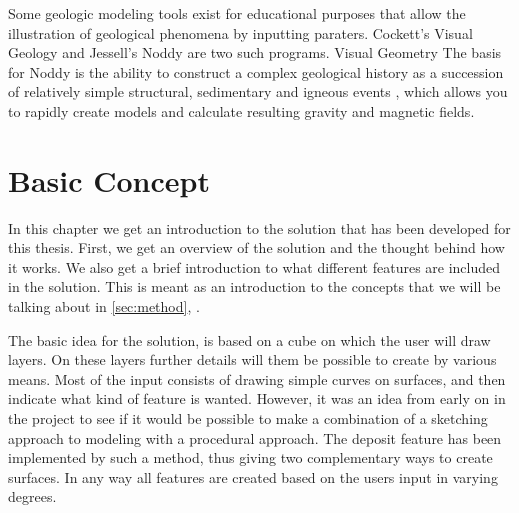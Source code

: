 \documentclass[a4paper,12pt]{report}
\newcommand{\secref}[1]{\autoref{#1}, \nameref{#1}}
\begin{document}
Some geologic modeling tools exist for educational purposes that allow the illustration of geological phenomena by inputting paraters. Cockett's Visual Geology \cite{Cockett:Online} and Jessell's Noddy \cite{jessell1981noddy} are two such programs. Visual Geometry  The basis for Noddy is the ability to construct a complex geological history as a succession of relatively simple structural, sedimentary and igneous events , which allows you to rapidly create models and calculate resulting gravity and magnetic fields.





\clearpage
\chapter{Basic Concept}
In this chapter we get an introduction to the solution that has been developed for this thesis. First, we get an overview of the solution and the thought behind how it works. We also get a brief introduction to what different features are included in the solution. This is meant as an introduction to the concepts that we will be talking about in \secref{sec:method}.
\label{sec:concept}

The basic idea for the solution, is based on a cube on which the user will draw layers. On these layers further details will them be possible to create by various means. Most of the input consists of drawing simple curves on surfaces, and then indicate what kind of feature is wanted. However, it was an idea from early on in the project to see if it would be possible to make a combination of a sketching approach to modeling with a procedural approach. The deposit feature has been implemented by such a method, thus giving two complementary ways to create surfaces. In any way all features are created based on the users input in varying degrees.
\end{document}
